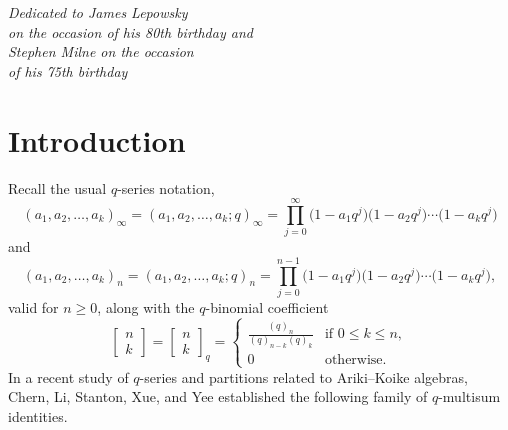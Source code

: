\documentclass[pdftex]{sigma}
\numberwithin{equation}{section}
\begin{document}

\begin{flushright}
\begin{minipage}{65mm}
\it Dedicated to James Lepowsky\\ on the occasion of his 80th birthday and\\ Stephen Milne on the occasion\\ of his 75th birthday
\end{minipage}
\end{flushright}

\renewcommand{\thefootnote}{\arabic{footnote}}
\setcounter{footnote}{0}

\section{Introduction}
Recall the usual $q$-series notation,
\begin{equation*}
	(a_1,a_2,\dots ,a_k)_{\infty} = (a_1,a_2,\dots ,a_k;q)_{\infty} = \prod_{j=0}^{\infty} \bigl(1-a_1q^j\bigr)\bigl(1-a_2q^j\bigr) \cdots \bigl(1-a_kq^j\bigr)
\end{equation*}
and
\begin{equation*}
	(a_1,a_2,\dots ,a_k)_n = (a_1,a_2,\dots ,a_k;q)_n = \prod_{j=0}^{n-1} \bigl(1-a_1q^j\bigr)\bigl(1-a_2q^j\bigr) \cdots \bigl(1-a_kq^j\bigr),
\end{equation*}
valid for $n \geq 0$, along with the $q$-binomial coefficient
\begin{equation} \label{eqn:qbinom}
	\begin{bmatrix} n \\ k \end{bmatrix} = \begin{bmatrix} n \\ k \end{bmatrix}_q =
	\begin{cases}
		\displaystyle\frac{(q)_n}{(q)_{n-k}(q)_k} & \text{if $0 \leq k \leq n$}, \\
		0 & \text{otherwise}.
	\end{cases}
\end{equation}
In a recent study of $q$-series and partitions related to Ariki--Koike algebras, Chern, Li, Stanton, Xue, and Yee \cite{CLSXY} established the following family of $q$-multisum identities.
\end{document}
